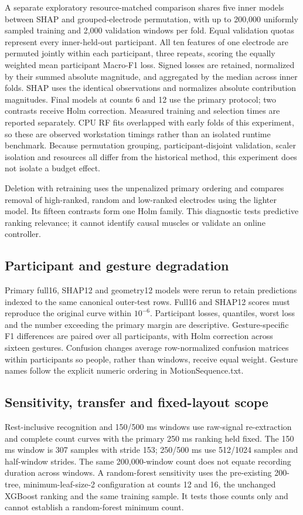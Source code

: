 A separate exploratory resource-matched comparison shares five inner models between SHAP and grouped-electrode permutation, with up to 200,000 uniformly sampled training and 2,000 validation windows per fold. Equal validation quotas represent every inner-held-out participant. All ten features of one electrode are permuted jointly within each participant, three repeats, scoring the equally weighted mean participant Macro-F1 loss. Signed losses are retained, normalized by their summed absolute magnitude, and aggregated by the median across inner folds. SHAP uses the identical observations and normalizes absolute contribution magnitudes. Final models at counts 6 and 12 use the primary protocol; two contrasts receive Holm correction. Measured training and selection times are reported separately. CPU RF fits overlapped with early folds of this experiment, so these are observed workstation timings rather than an isolated runtime benchmark. Because permutation grouping, participant-disjoint validation, scaler isolation and resources all differ from the historical method, this experiment does not isolate a budget effect.

Deletion with retraining uses the unpenalized primary ordering and compares removal of high-ranked, random and low-ranked electrodes using the lighter model. Its fifteen contrasts form one Holm family. This diagnostic tests predictive ranking relevance; it cannot identify causal muscles or validate an online controller.

\subsection{Participant and gesture degradation}
Primary full16, SHAP12 and geometry12 models were rerun to retain predictions indexed to the same canonical outer-test rows. Full16 and SHAP12 scores must reproduce the original curve within $10^{-6}$. Participant losses, quantiles, worst loss and the number exceeding the primary margin are descriptive. Gesture-specific F1 differences are paired over all participants, with Holm correction across sixteen gestures. Confusion changes average row-normalized confusion matrices within participants so people, rather than windows, receive equal weight. Gesture names follow the explicit numeric ordering in MotionSequence.txt.

\subsection{Sensitivity, transfer and fixed-layout scope}
Rest-inclusive recognition and 150/500 ms windows use raw-signal re-extraction and complete count curves with the primary 250 ms ranking held fixed. The 150 ms window is 307 samples with stride 153; 250/500 ms use 512/1024 samples and half-window strides. The same 200,000-window count does not equate recording duration across windows. A random-forest sensitivity uses the pre-existing 200-tree, minimum-leaf-size-2 configuration at counts 12 and 16, the unchanged XGBoost ranking and the same training sample. It tests those counts only and cannot establish a random-forest minimum count.

